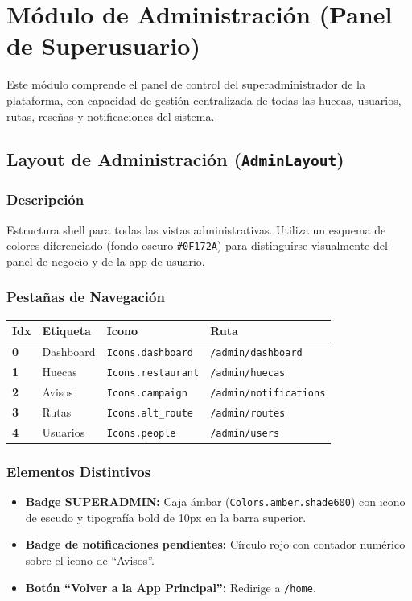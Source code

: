 \documentclass[11pt, a4paper, oneside]{report}
\begin{document}
\chapter{Módulo de Administración (Panel de Superusuario)}

Este módulo comprende el panel de control del superadministrador de la plataforma, con capacidad de gestión centralizada de todas las huecas, usuarios, rutas, reseñas y notificaciones del sistema.

\section{Layout de Administración (\texttt{AdminLayout})}

\subsection{Descripción}
Estructura shell para todas las vistas administrativas. Utiliza un esquema de colores diferenciado (fondo oscuro \texttt{\#0F172A}) para distinguirse visualmente del panel de negocio y de la app de usuario.

\subsection{Pestañas de Navegación}
\begin{longtable}{>{\bfseries}p{1cm} p{3cm} p{3cm} p{6cm}}
\toprule
\textbf{Idx} & \textbf{Etiqueta} & \textbf{Icono} & \textbf{Ruta} \\
\midrule
0 & Dashboard & \texttt{Icons.dashboard} & \texttt{/admin/dashboard} \\
1 & Huecas & \texttt{Icons.restaurant} & \texttt{/admin/huecas} \\
2 & Avisos & \texttt{Icons.campaign} & \texttt{/admin/notifications} \\
3 & Rutas & \texttt{Icons.alt\_route} & \texttt{/admin/routes} \\
4 & Usuarios & \texttt{Icons.people} & \texttt{/admin/users} \\
\bottomrule
\end{longtable}

\subsection{Elementos Distintivos}
\begin{itemize}
  \item \textbf{Badge SUPERADMIN:} Caja ámbar (\texttt{Colors.amber.shade600}) con icono de escudo y tipografía bold de 10px en la barra superior.
  \item \textbf{Badge de notificaciones pendientes:} Círculo rojo con contador numérico sobre el icono de ``Avisos''.
  \item \textbf{Botón ``Volver a la App Principal'':} Redirige a \texttt{/home}.
\end{itemize}
\end{document}
